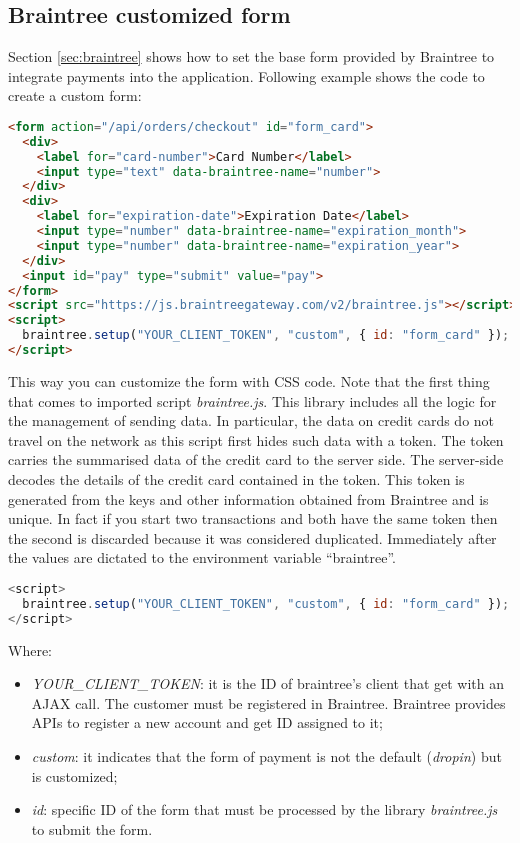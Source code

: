 \subsection{Braintree customized form}
 Section \ref{sec:braintree} shows how to set the base form provided by Braintree to integrate payments into the application. Following example shows the code to create a custom form:
\begin{lstlisting}[language=html]
<form action="/api/orders/checkout" id="form_card">
  <div>
    <label for="card-number">Card Number</label>
    <input type="text" data-braintree-name="number">
  </div>
  <div>
    <label for="expiration-date">Expiration Date</label>
    <input type="number" data-braintree-name="expiration_month">
    <input type="number" data-braintree-name="expiration_year">
  </div>
  <input id="pay" type="submit" value="pay">
</form>
<script src="https://js.braintreegateway.com/v2/braintree.js"></script>
<script>
  braintree.setup("YOUR_CLIENT_TOKEN", "custom", { id: "form_card" });
</script>
\end{lstlisting}
This way you can customize the form with CSS code.
Note that the first thing that comes to imported script \emph{braintree.js}.
This library includes all the logic for the management of sending data. In particular, the data on credit cards do not travel on the network as this script first hides such data with a token. The token carries the summarised data of the credit card to the server side. The server-side decodes the details of the credit card contained in the token. This token is generated from the keys and other information obtained from Braintree and is unique. In fact if you start two transactions and both have the same token then the second is discarded because it was considered duplicated.
Immediately after the values are dictated to the environment variable “braintree”.
\begin{lstlisting}[language=javascript]
<script>
  braintree.setup("YOUR_CLIENT_TOKEN", "custom", { id: "form_card" });
</script>
\end{lstlisting}
Where:
\begin{itemize}
\item \emph{YOUR\_CLIENT\_TOKEN}: it is the ID of braintree's client that get with an AJAX call. The customer must be registered in Braintree.
Braintree provides APIs to register a new account and get ID assigned to it;
\item \emph{custom}: it indicates that the form of payment is not the default (\emph{dropin}) but is customized;
\item \emph{id}: specific ID of the form that must be processed by the library \emph{braintree.js} to submit the form.
\end{itemize}
